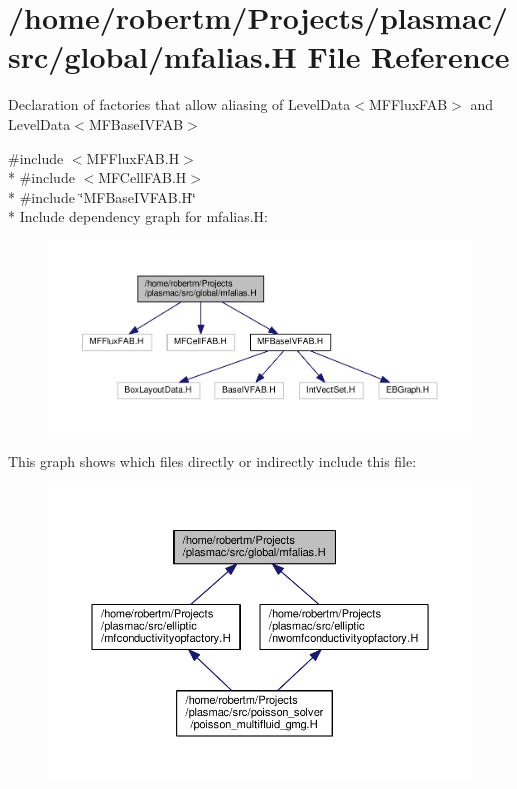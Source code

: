 \hypertarget{mfalias_8H}{}\section{/home/robertm/\+Projects/plasmac/src/global/mfalias.H File Reference}
\label{mfalias_8H}


Declaration of factories that allow aliasing of Level\+Data$<$\+M\+F\+Flux\+F\+A\+B$>$ and Level\+Data$<$\+M\+F\+Base\+I\+V\+F\+A\+B$>$  


{\ttfamily \#include $<$M\+F\+Flux\+F\+A\+B.\+H$>$}\\*
{\ttfamily \#include $<$M\+F\+Cell\+F\+A\+B.\+H$>$}\\*
{\ttfamily \#include \char`\"{}M\+F\+Base\+I\+V\+F\+A\+B.\+H\char`\"{}}\\*
Include dependency graph for mfalias.\+H\+:\nopagebreak
\begin{figure}[H]
\begin{center}
\leavevmode
\includegraphics[width=350pt]{mfalias_8H__incl}
\end{center}
\end{figure}
This graph shows which files directly or indirectly include this file\+:\nopagebreak
\begin{figure}[H]
\begin{center}
\leavevmode
\includegraphics[width=350pt]{mfalias_8H__dep__incl}
\end{center}
\end{figure}
